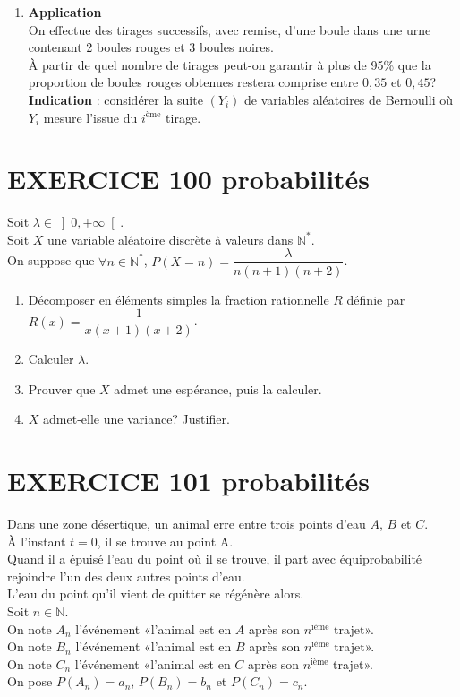 \documentclass[10pt,oneside]{article}
\begin{document}
\begin{flushleft}
\begin{enumerate}
Prouver que: $\forall\:a\in \left] 0,+\infty\right[ $, $P\left( \left|\dfrac{S_n}{n}-E(Y_1)\right|\geqslant a\right) \leqslant\dfrac{V(Y_1)}{na^2}$.
\item \textbf{Application}\\
On effectue des tirages successifs, avec remise, d'une boule dans une urne contenant 2 boules rouges et 3 boules noires.\\
\`A partir de quel nombre de tirages peut-on garantir à plus de 95\% que la proportion de boules rouges obtenues restera comprise entre $0,35$ et $0,45$?\\
\textbf{Indication} : considérer la suite $(Y_i)$ de variables aléatoires de Bernoulli où $Y_i$ mesure l'issue du $i^{\text{ème}}$  tirage.

\end{enumerate}
 
 

\section*{EXERCICE 100 \:probabilités}
Soit $\lambda \in{\left] 0,+\infty\right[ }$.\\
Soit $X$ une variable aléatoire discrète à valeurs dans $\mathbb{N}^\ast$.\\
On suppose que $\forall n\in\mathbb{N}^\ast$, $P(X=n)=\dfrac{\lambda}{n(n+1)(n+2)} $.
\begin{enumerate}
\item Décomposer en éléments simples la fraction rationnelle $R$ définie par $R(x)=\dfrac{1}{x(x+1)(x+2)}$.
\item
Calculer $\lambda$.
\item
Prouver que $X$ admet une espérance, puis la calculer.
\item
$X$ admet-elle une variance? Justifier.

\end{enumerate}


\section*{EXERCICE 101 \:probabilités}


Dans une zone désertique, un animal  erre entre trois points d'eau $A$, $B$ et $C$.\\
\`A l'instant $t=0$, il se trouve au point A.\\
Quand il a épuisé l'eau du point où il se trouve, il part avec équiprobabilité rejoindre l'un des deux autres points d'eau.\\
 L'eau du point qu'il vient de quitter se régénère alors.\\
\medskip
Soit $n\in\mathbb{N}$.\\
On note $A_n$ l'événement «l'animal est en $A$  après son $n^{\text{ième}}$ trajet».\\
On note $B_n$ l'événement «l'animal est en $B$  après son $n^{\text{ième}}$ trajet».\\
On note $C_n$ l'événement «l'animal est en $C$  après son $n^{\text{ième}}$ trajet».\\
\medskip
On pose $P(A_n)=a_n$, $P(B_n)=b_n$ et $P(C_n)=c_n$.


\end{flushleft}
\end{document}
